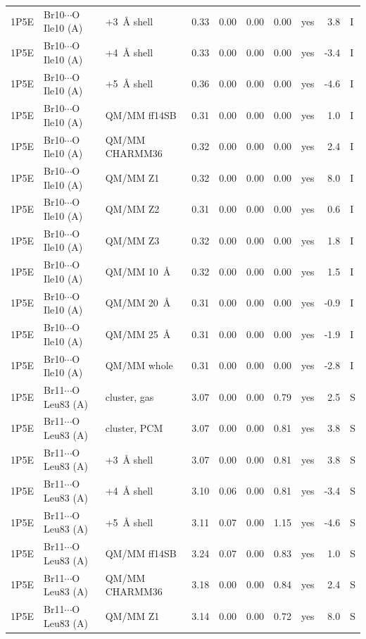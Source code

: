\documentclass[journal=jcisd8,manuscript=suppinfo]{achemso}
\begin{document}
\begin{singlespace}
{\begin{longtable}{lllrrrrlrl}
1P5E & Br10$\cdots$O Ile10 (A) & +3~\AA{} shell & 0.33 & 0.00 & 0.00 & 0.00 & yes & 3.8 & I\\
1P5E & Br10$\cdots$O Ile10 (A) & +4~\AA{} shell & 0.33 & 0.00 & 0.00 & 0.00 & yes & -3.4 & I\\
1P5E & Br10$\cdots$O Ile10 (A) & +5~\AA{} shell & 0.36 & 0.00 & 0.00 & 0.00 & yes & -4.6 & I\\
1P5E & Br10$\cdots$O Ile10 (A) & QM/MM ff14SB & 0.31 & 0.00 & 0.00 & 0.00 & yes & 1.0 & I\\
1P5E & Br10$\cdots$O Ile10 (A) & QM/MM CHARMM36 & 0.32 & 0.00 & 0.00 & 0.00 & yes & 2.4 & I\\
1P5E & Br10$\cdots$O Ile10 (A) & QM/MM Z1 & 0.32 & 0.00 & 0.00 & 0.00 & yes & 8.0 & I\\
1P5E & Br10$\cdots$O Ile10 (A) & QM/MM Z2 & 0.31 & 0.00 & 0.00 & 0.00 & yes & 0.6 & I\\
1P5E & Br10$\cdots$O Ile10 (A) & QM/MM Z3 & 0.32 & 0.00 & 0.00 & 0.00 & yes & 1.8 & I\\
1P5E & Br10$\cdots$O Ile10 (A) & QM/MM 10~\AA{} & 0.32 & 0.00 & 0.00 & 0.00 & yes & 1.5 & I\\
1P5E & Br10$\cdots$O Ile10 (A) & QM/MM 20~\AA{} & 0.31 & 0.00 & 0.00 & 0.00 & yes & -0.9 & I\\
1P5E & Br10$\cdots$O Ile10 (A) & QM/MM 25~\AA{} & 0.31 & 0.00 & 0.00 & 0.00 & yes & -1.9 & I\\
1P5E & Br10$\cdots$O Ile10 (A) & QM/MM whole & 0.31 & 0.00 & 0.00 & 0.00 & yes & -2.8 & I\\
1P5E & Br11$\cdots$O Leu83 (A) & cluster, gas & 3.07 & 0.00 & 0.00 & 0.79 & yes & 2.5 & S\\
1P5E & Br11$\cdots$O Leu83 (A) & cluster, PCM & 3.07 & 0.00 & 0.00 & 0.81 & yes & 3.8 & S\\
1P5E & Br11$\cdots$O Leu83 (A) & +3~\AA{} shell & 3.07 & 0.00 & 0.00 & 0.81 & yes & 3.8 & S\\
1P5E & Br11$\cdots$O Leu83 (A) & +4~\AA{} shell & 3.10 & 0.06 & 0.00 & 0.81 & yes & -3.4 & S\\
1P5E & Br11$\cdots$O Leu83 (A) & +5~\AA{} shell & 3.11 & 0.07 & 0.00 & 1.15 & yes & -4.6 & S\\
1P5E & Br11$\cdots$O Leu83 (A) & QM/MM ff14SB & 3.24 & 0.07 & 0.00 & 0.83 & yes & 1.0 & S\\
1P5E & Br11$\cdots$O Leu83 (A) & QM/MM CHARMM36 & 3.18 & 0.00 & 0.00 & 0.84 & yes & 2.4 & S\\
1P5E & Br11$\cdots$O Leu83 (A) & QM/MM Z1 & 3.14 & 0.00 & 0.00 & 0.72 & yes & 8.0 & S\\

\end{longtable}}
\end{singlespace}
\end{document}
